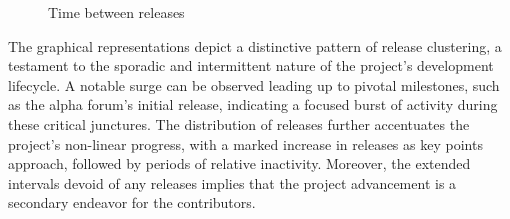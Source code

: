 \begin{figure}[h!]
	\centering
	\caption{Time between releases}
	\label{fig:releases-lines}
\end{figure}


\begin{multicols}{3}
	\noindent
	The graphical representations depict a distinctive pattern of release clustering, a testament to the sporadic and intermittent nature of the project's development lifecycle. A notable surge can be observed leading up to pivotal milestones, such as the alpha forum's initial release, indicating a focused burst of activity during these critical junctures.
	\noindent
	The distribution of releases further accentuates the project's non-linear progress, with a marked increase in releases as key points approach, followed by periods of relative inactivity.
	\noindent
	Moreover, the extended intervals devoid of any releases implies that the project advancement is a secondary endeavor for the contributors.
\end{multicols}


